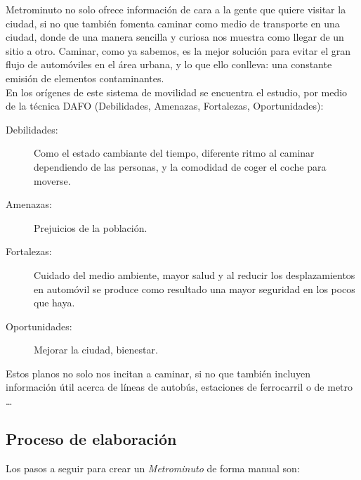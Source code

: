Metrominuto no solo ofrece información de cara a la gente que quiere visitar la ciudad, si no que también fomenta caminar como medio de transporte en una ciudad, donde de una manera sencilla y curiosa nos muestra como llegar de un sitio a otro. Caminar, como ya sabemos, es la mejor solución para evitar el gran flujo de automóviles en el área urbana, y lo que ello conlleva: una constante emisión de elementos contaminantes. \\
En los orígenes de este sistema de movilidad se encuentra el estudio, por medio de la técnica DAFO (Debilidades, Amenazas, Fortalezas, Oportunidades):

\begin{description}
	\item[Debilidades:] Como el estado cambiante del tiempo, diferente ritmo al caminar dependiendo de las personas, y la comodidad de coger el coche para moverse.
	\item[Amenazas:] Prejuicios de la población.
	\item[Fortalezas:] Cuidado del medio ambiente, mayor salud y al reducir los desplazamientos en automóvil se produce como resultado una mayor seguridad en los pocos que haya.
	\item[Oportunidades:] Mejorar la ciudad, bienestar.
\end{description}
Estos planos no solo nos incitan a caminar, si no que también incluyen información útil acerca de líneas de autobús, estaciones de ferrocarril o de metro \dots

\subsection{Proceso de elaboración}
Los pasos a seguir para crear un \textit{Metrominuto} de forma manual son:

